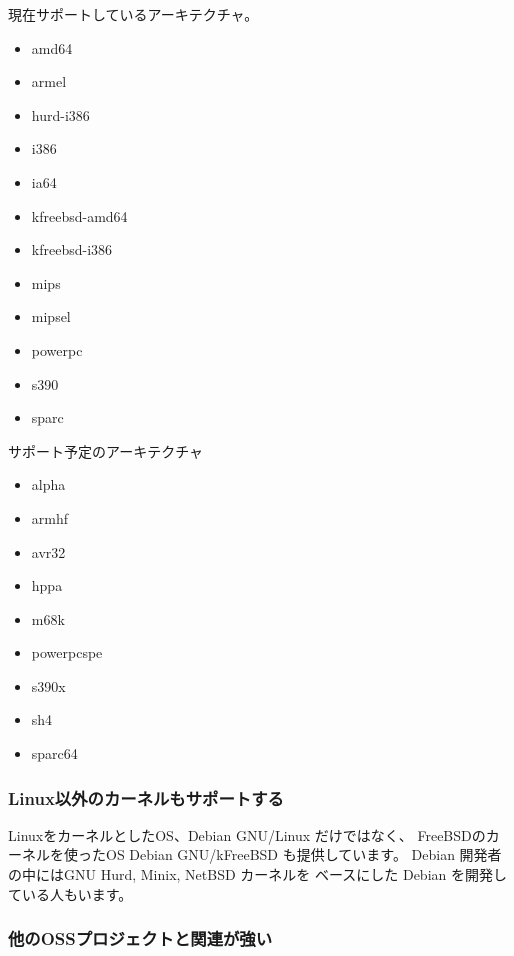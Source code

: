 \documentclass[mingoth,a4paper]{jsarticle}
\begin{document}
\begin{minipage}[t]{0.5\hsize}

現在サポートしているアーキテクチャ。
\begin{itemize}
  \item amd64
  \item armel
  \item hurd-i386
  \item i386
  \item ia64
  \item kfreebsd-amd64
  \item kfreebsd-i386
  \item mips
  \item mipsel
  \item powerpc
  \item s390
  \item sparc
\end{itemize}

\end{minipage}
\begin{minipage}[t]{0.5\hsize}

サポート予定のアーキテクチャ
\begin{itemize}
  \item alpha
  \item armhf
  \item avr32
  \item hppa
  \item m68k
  \item powerpcspe
  \item s390x
  \item sh4
  \item sparc64
\end{itemize}

\end{minipage}

\subsubsection{Linux以外のカーネルもサポートする}

LinuxをカーネルとしたOS、Debian GNU/Linux だけではなく、
FreeBSDのカーネルを使ったOS Debian GNU/kFreeBSD
も提供しています。
Debian 開発者の中にはGNU Hurd, Minix, NetBSD カーネルを
ベースにした Debian を開発している人もいます。

\subsubsection{他のOSSプロジェクトと関連が強い}
\end{document}

